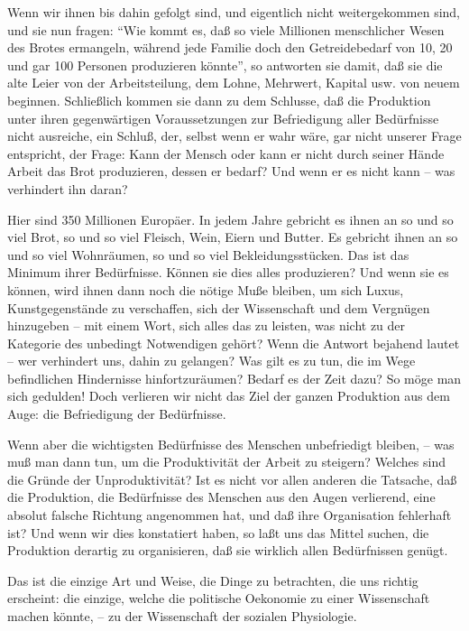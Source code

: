 \documentclass{scrbook}
\begin{document}
Wenn wir ihnen bis dahin gefolgt sind, und eigentlich nicht weitergekommen sind, und sie nun fragen: ``Wie kommt es, daß so viele Millionen menschlicher Wesen des Brotes ermangeln, während jede Familie doch den Getreidebedarf von 10, 20 und gar 100 Personen produzieren könnte'', so antworten sie damit, daß sie die alte Leier von der Arbeitsteilung, dem Lohne, Mehrwert, Kapital usw. von neuem beginnen. Schließlich kommen sie dann zu dem Schlusse, daß die Produktion unter ihren gegenwärtigen Voraussetzungen zur Befriedigung aller Bedürfnisse nicht ausreiche, ein Schluß, der, selbst wenn er wahr wäre, gar nicht unserer Frage entspricht, der Frage: Kann der Mensch oder kann er nicht durch seiner Hände Arbeit das Brot produzieren, dessen er bedarf? Und wenn er es nicht kann – was verhindert ihn daran?

Hier sind 350 Millionen Europäer. In jedem Jahre gebricht es ihnen an so und so viel Brot, so und so viel Fleisch, Wein, Eiern und Butter. Es gebricht ihnen an so und so viel Wohnräumen, so und so viel Bekleidungsstücken. Das ist das Minimum ihrer Bedürfnisse. Können sie dies alles produzieren? Und wenn sie es können, wird ihnen dann noch die nötige Muße bleiben, um sich Luxus, Kunstgegenstände zu verschaffen, sich der Wissenschaft und dem Vergnügen hinzugeben – mit einem Wort, sich alles das zu leisten, was nicht zu der Kategorie des unbedingt Notwendigen gehört? Wenn die Antwort bejahend lautet – wer verhindert uns, dahin zu gelangen? Was gilt es zu tun, die im Wege befindlichen Hindernisse hinfortzuräumen? Bedarf es der Zeit dazu? So möge man sich gedulden! Doch verlieren wir nicht das Ziel der ganzen Produktion aus dem Auge: die Befriedigung der Bedürfnisse.

Wenn aber die wichtigsten Bedürfnisse des Menschen unbefriedigt bleiben, – was muß man dann tun, um die Produktivität der Arbeit zu steigern? Welches sind die Gründe der Unproduktivität? Ist es nicht vor allen anderen die Tatsache, daß die Produktion, die Bedürfnisse des Menschen aus den Augen verlierend, eine absolut falsche Richtung angenommen hat, und daß ihre Organisation fehlerhaft ist? Und wenn wir dies konstatiert haben, so laßt uns das Mittel suchen, die Produktion derartig zu organisieren, daß sie wirklich allen Bedürfnissen genügt.

Das ist die einzige Art und Weise, die Dinge zu betrachten, die uns richtig erscheint: die einzige, welche die politische Oekonomie zu einer Wissenschaft machen könnte, – zu der Wissenschaft der sozialen Physiologie.
\end{document}
